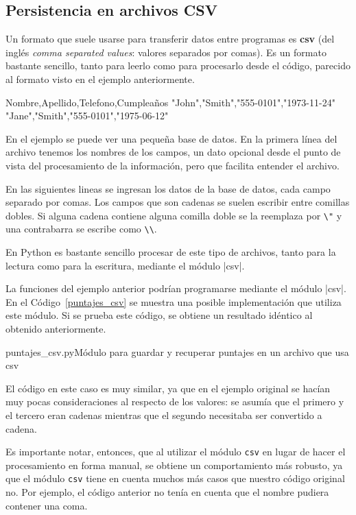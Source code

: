 \subsection{Persistencia en archivos CSV}

Un formato que suele usarse para transferir datos entre programas es
\textbf{csv} (del inglés \emph{comma separated values}: valores separados
por comas). Es un formato bastante sencillo, tanto para leerlo como para
procesarlo desde el código, parecido al formato visto en el ejemplo
anteriormente.

\begin{codigo-nohl-sn}
Nombre,Apellido,Telefono,Cumpleaños
"John","Smith","555-0101","1973-11-24"
"Jane","Smith","555-0101","1975-06-12"
\end{codigo-nohl-sn}

En el ejemplo se puede ver una pequeña base de datos. En la primera línea
del archivo tenemos los nombres de los campos, un dato opcional desde el
punto de vista del procesamiento de la información, pero que facilita
entender el archivo.

En las siguientes lineas se ingresan los datos de la base de datos, cada
campo separado por comas. Los campos que son cadenas se suelen escribir
entre comillas dobles. Si alguna cadena contiene alguna comilla doble se la
reemplaza por \verb!\"! y una contrabarra se escribe como \verb!\\!.

En Python es bastante sencillo procesar de este tipo de archivos, tanto
para la lectura como para la escritura, mediante el módulo |csv|.

La funciones del ejemplo anterior podrían programarse mediante el módulo
|csv|.  En el Código~\ref{puntajes_csv} se muestra una posible implementación
que utiliza este módulo.  Si se prueba este código, se obtiene un resultado
idéntico al obtenido anteriormente.

\begin{codigo}{puntajes\_csv.py}{Módulo para guardar y recuperar puntajes en un archivo que usa csv}
\label{puntajes_csv}

\end{codigo}

El código en este caso es muy similar, ya que en el ejemplo original se
hacían muy pocas consideraciones al respecto de los valores: se asumía que
el primero y el tercero eran cadenas mientras que el segundo necesitaba ser
convertido a cadena.

\begin{observacion}
Es importante notar, entonces, que al utilizar el módulo \lstinline!csv!
en lugar de hacer el procesamiento en forma manual, se obtiene un
comportamiento más robusto, ya que el módulo \lstinline!csv! tiene en
cuenta muchos más casos que nuestro código original no. Por ejemplo, el
código anterior no tenía en cuenta que el nombre pudiera contener una coma.
\end{observacion}

